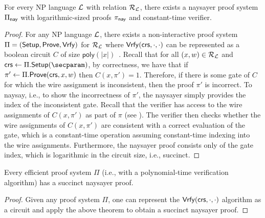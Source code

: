 \begin{theorem}\label{thm:naysayingNPCircuit}
    For every NP language $\mathcal{L}$ with relation $\mathcal{R}_{\mathcal{L}}$, 
    there exists a naysayer proof system $\Pi_{\mathsf{nay}}$ with logarithmic-sized proofs $\pi_{\mathsf{nay}}$ and constant-time verifier.
\end{theorem}
\begin{proof}
    For any NP language $\mathcal{L}$, there exists a non-interactive proof system $\Pi = (\mathsf{Setup}, \mathsf{Prove}, \mathsf{Vrfy})$ for $\mathcal{R}_{\mathcal{L}}$ where $\mathsf{Vrfy}(\mathsf{crs}, \cdot, \cdot)$ can be represented as a boolean circuit $C$ of size $\mathsf{poly}(\lvert x \rvert)$~\cite{C:LapSha90}. Recall that for all $(x,w) \in \mathcal{R}_{\mathcal{L}}$ and $\crs \gets \Pi.\setup(\secparam)$, by correctness, we have that if $\pi' \gets \Pi.\mathsf{Prove}(\mathsf{crs}, x, w)$ then $C(x,\pi') = 1$. Therefore, if there is some gate of $C$ for which the wire assignment is inconsistent, then the proof $\pi'$ is incorrect. To naysay, i.e., to show the incorrectness of $\pi'$, the naysayer simply provides the index of the inconsistent gate.
    Recall that the verifier has access to the wire assignments of $C(x,\pi')$ as part of $\pi$ (see ). 
    The verifier then checks whether the wire assignments of $C(x,\pi')$ are consistent with a correct evaluation of the gate, which is a constant-time operation assuming constant-time indexing into the wire assignments. 
    Furthermore, the naysayer proof consists only of the gate index, which is logarithmic in the circuit size, i.e., succinct.
\end{proof}

\begin{corollary}
    Every efficient proof system $\Pi$ (i.e., with a polynomial-time verification algorithm) has a succinct naysayer proof.
\end{corollary}
\begin{proof}
Given any proof system $\Pi$, one can represent the $\mathsf{Vrfy}(\mathsf{crs},\cdot,\cdot)$ algorithm as a circuit and apply the above theorem to obtain a succinct naysayer proof.
\end{proof}
